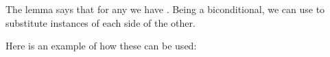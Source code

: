 \documentclass[letterpaper,10pt,english]{sphinxmanual}
\begin{document}
\begin{sphinxVerbatim}[commandchars=\\\{\}]
             
           
   \PYG{o}{[}\PYG{o}{]}
\end{sphinxVerbatim}

\sphinxAtStartPar
The lemma  says that for any  we have
.
Being a biconditional,
we can use  to substitute instances of each side of the other.

\sphinxAtStartPar
Here is an example of how these can be used:
\end{document}
